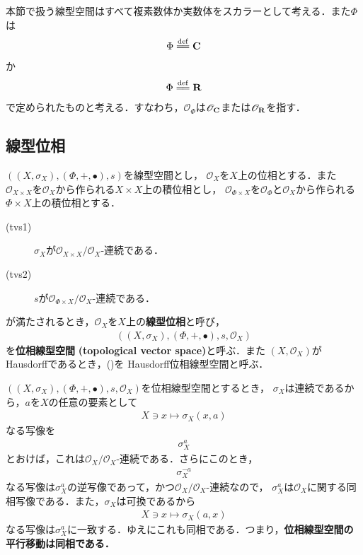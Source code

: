 	本節で扱う線型空間はすべて複素数体か実数体をスカラーとして考える．また$\Phi$は
	\begin{align}
		\Phi \defeq \C
	\end{align}
	か
	\begin{align}
		\Phi \defeq \R
	\end{align}
	で定められたものと考える．すなわち，$\mathscr{O}_\Phi$は$\mathscr{O}_{\mathbf{C}}$または$\mathscr{O}_{\mathbf{R}}$を指す．
	
\subsection{線型位相}
	\begin{screen}
		\begin{dfn}[位相線型空間]\label{def:topological_vector_space}
			$\left(\left(X,\sigma_X\right),(\Phi,+,\bullet),s\right)$を線型空間とし，
			$\mathscr{O}_X$を$X$上の位相とする．また
			$\mathscr{O}_{X \times X}$を$\mathscr{O}_X$から作られる$X \times X$上の積位相とし，
			$\mathscr{O}_{\Phi \times X}$を$\mathscr{O}_\Phi$と$\mathscr{O}_X$から作られる$\Phi \times X$上の積位相とする．
			\begin{description}
				\item[(tvs1)] $\sigma_X$が$\mathscr{O}_{X \times X}/\mathscr{O}_X$-連続である．
				\item[(tvs2)] $s$が$\mathscr{O}_{\Phi \times X}/\mathscr{O}_X$-連続である．
			\end{description}
			が満たされるとき，$\mathscr{O}_X$を$X$上の{\bf 線型位相}と呼び，
			\begin{align}
				\left(\left(X,\sigma_X\right),(\Phi,+,\bullet),s,\mathscr{O}_X\right)
				\label{pair_topological_vector_space}
			\end{align}
			を{\bf 位相線型空間}
			{\bf (topological vector space)}と呼ぶ．また
			$(X,\mathscr{O}_X)$がHausdorffであるとき，()を
			Hausdorff位相線型空間と呼ぶ．
		\end{dfn}
	\end{screen}
	
	$\left(\left(X,\sigma_X\right),(\Phi,+,\bullet),s,\mathscr{O}_X\right)$を位相線型空間とするとき，
	$\sigma_X$は連続であるから，$a$を$X$の任意の要素として
	\begin{align}
		X \ni x \longmapsto \sigma_X(x,a)
	\end{align}
	なる写像を
	\begin{align}
		\sigma_X^a
	\end{align}
	とおけば，これは$\mathscr{O}_X/\mathscr{O}_X$-連続である．さらにこのとき，
	\begin{align}
		\sigma_X^{-a}
	\end{align}
	なる写像は$\sigma_X^a$の逆写像であって，かつ$\mathscr{O}_X/\mathscr{O}_X$-連続なので，
	$\sigma_X^a$は$\mathscr{O}_X$に関する同相写像である．また，$\sigma_X$は可換であるから
	\begin{align}
		X \ni x \longmapsto \sigma_X(a,x)
	\end{align}
	なる写像は$\sigma_X^a$に一致する．ゆえにこれも同相である．つまり，{\bf 位相線型空間の平行移動は同相である．}
	

